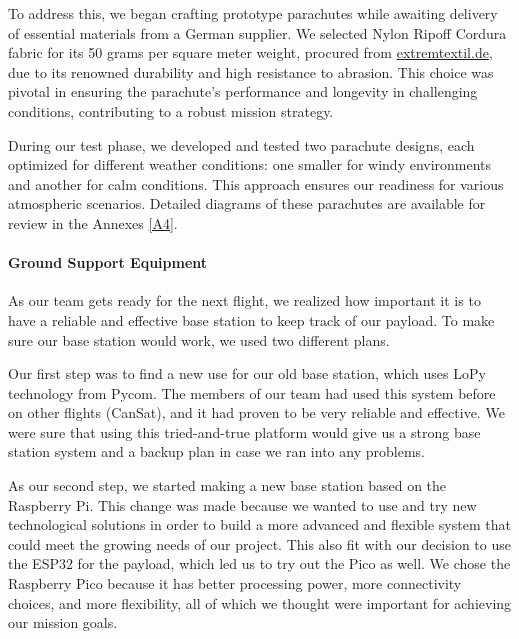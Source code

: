 To address this, we began crafting prototype parachutes while awaiting delivery of essential materials from a German supplier. We selected Nylon Ripoff Cordura fabric for its 50 grams per square meter weight, procured from \href{https://www.extremtextil.de/}{extremtextil.de}, due to its renowned durability and high resistance to abrasion. This choice was pivotal in ensuring the parachute's performance and longevity in challenging conditions, contributing to a robust mission strategy.

During our test phase, we developed and tested two parachute designs, each optimized for different weather conditions: one smaller for windy environments and another for calm conditions. This approach ensures our readiness for various atmospheric scenarios. Detailed diagrams of these parachutes are available for review in the Annexes \ref{A4}.



\paragraph*{Ground Support Equipment}

As our team gets ready for the next flight, we realized how important it is to have a reliable and effective base station to keep track of our payload. To make sure our base station would work, we used two different plans.

Our first step was to find a new use for our old base station, which uses LoPy technology from Pycom. The members of our team had used this system before on other flights (CanSat), and it had proven to be very reliable and effective. We were sure that using this tried-and-true platform would give us a strong base station system and a backup plan in case we ran into any problems.


As our second step, we started making a new base station based on the Raspberry Pi. This change was made because we wanted to use and try new technological solutions in order to build a more advanced and flexible system that could meet the growing needs of our project. This also fit with our decision to use the ESP32 for the payload, which led us to try out the Pico as well. We chose the Raspberry Pico because it has better processing power, more connectivity choices, and more flexibility, all of which we thought were important for achieving our mission goals.

